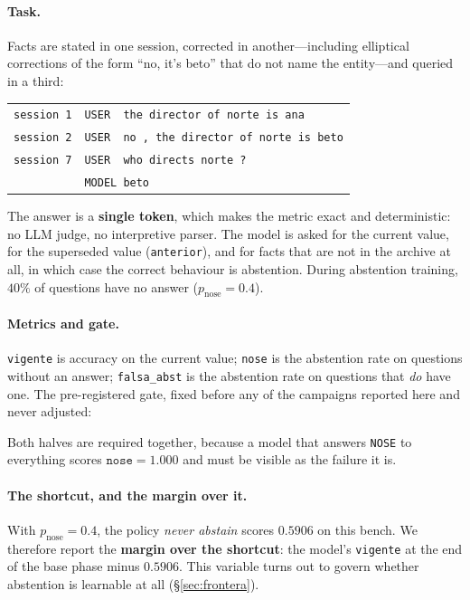 \documentclass[11pt,a4paper]{article}
\begin{document}
\paragraph{Task.} Facts are stated in one session, corrected in another---including elliptical
corrections of the form ``no, it's beto'' that do not name the entity---and queried in a third:

\begin{center}
\begin{tabular}{ll}
\texttt{session 1} & \texttt{USER\ \ the director of norte is ana}\\
\texttt{session 2} & \texttt{USER\ \ no , the director of norte is beto}\\
\texttt{session 7} & \texttt{USER\ \ who directs norte ?}\\
                   & \texttt{MODEL\ beto}\\
\end{tabular}
\end{center}

The answer is a \textbf{single token}, which makes the metric exact and deterministic: no LLM judge,
no interpretive parser. The model is asked for the current value, for the superseded value
(\texttt{anterior}), and for facts that are not in the archive at all, in which case the correct
behaviour is abstention. During abstention training, $40\%$ of questions have no answer
($p_{\mathrm{nose}} = 0.4$).

\paragraph{Metrics and gate.} \texttt{vigente} is accuracy on the current value; \texttt{nose} is
the abstention rate on questions without an answer; \texttt{falsa\_abst} is the abstention rate on
questions that \emph{do} have one. The pre-registered gate, fixed before any of the campaigns
reported here and never adjusted:

\begin{center}
\end{center}

Both halves are required together, because a model that answers \texttt{NOSE} to everything scores
$\texttt{nose} = 1.000$ and must be visible as the failure it is.

\paragraph{The shortcut, and the margin over it.} With $p_{\mathrm{nose}} = 0.4$, the policy
\emph{never abstain} scores $0.5906$ on this bench. We therefore report the \textbf{margin over the
shortcut}: the model's \texttt{vigente} at the end of the base phase minus $0.5906$. This variable
turns out to govern whether abstention is learnable at all (\S\ref{sec:frontera}).
\end{document}

